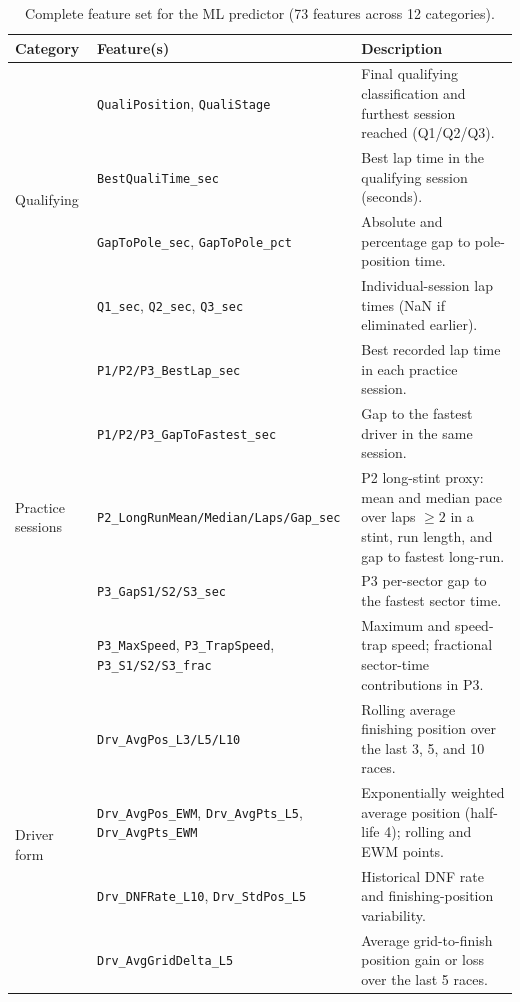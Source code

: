 \documentclass[12pt, a4paper, oneside]{report}
\begin{document}
\begin{table}[H]
\centering
\caption{Complete feature set for the ML predictor (73 features across 12 categories).}
\label{tab:features}
\renewcommand{\arraystretch}{1.2}
\begin{tabularx}{\textwidth}{@{} l l X @{}}
  \toprule
  \textbf{Category} & \textbf{Feature(s)} & \textbf{Description} \\
  \midrule
  \multirow{4}{*}{Qualifying}
    & \texttt{QualiPosition}, \texttt{QualiStage}
      & Final qualifying classification and furthest session reached (Q1/Q2/Q3). \\
    & \texttt{BestQualiTime\_sec}
      & Best lap time in the qualifying session (seconds). \\
    & \texttt{GapToPole\_sec}, \texttt{GapToPole\_pct}
      & Absolute and percentage gap to pole-position time. \\
    & \texttt{Q1\_sec}, \texttt{Q2\_sec}, \texttt{Q3\_sec}
      & Individual-session lap times (NaN if eliminated earlier). \\
  \midrule
  \multirow{5}{*}{Practice sessions}
    & \texttt{P1/P2/P3\_BestLap\_sec}
      & Best recorded lap time in each practice session. \\
    & \texttt{P1/P2/P3\_GapToFastest\_sec}
      & Gap to the fastest driver in the same session. \\
    & \texttt{P2\_LongRunMean/Median/Laps/Gap\_sec}
      & P2 long-stint proxy: mean and median pace over laps $\geq 2$ in a stint, run length, and gap to fastest long-run. \\
    & \texttt{P3\_GapS1/S2/S3\_sec}
      & P3 per-sector gap to the fastest sector time. \\
    & \texttt{P3\_MaxSpeed}, \texttt{P3\_TrapSpeed}, \texttt{P3\_S1/S2/S3\_frac}
      & Maximum and speed-trap speed; fractional sector-time contributions in P3. \\
  \midrule
  \multirow{4}{*}{Driver form}
    & \texttt{Drv\_AvgPos\_L3/L5/L10}
      & Rolling average finishing position over the last 3, 5, and 10 races. \\
    & \texttt{Drv\_AvgPos\_EWM}, \texttt{Drv\_AvgPts\_L5}, \texttt{Drv\_AvgPts\_EWM}
      & Exponentially weighted average position (half-life 4); rolling and EWM points. \\
    & \texttt{Drv\_DNFRate\_L10}, \texttt{Drv\_StdPos\_L5}
      & Historical DNF rate and finishing-position variability. \\
    & \texttt{Drv\_AvgGridDelta\_L5}
      & Average grid-to-finish position gain or loss over the last 5 races. \\

\end{tabularx}
\end{table}
\end{document}
